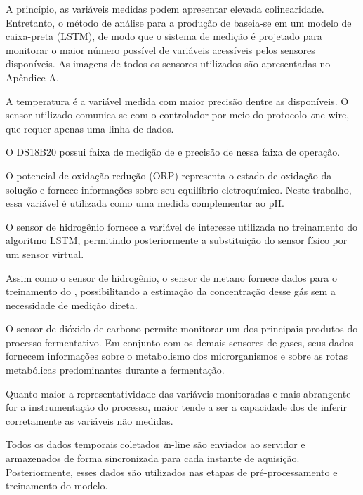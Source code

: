 \startsection[title={Sensores}]
	A princípio, as variáveis medidas podem apresentar elevada colinearidade. Entretanto, o método de análise para a produção de \getbuffer[sens] baseia-se em um modelo de caixa-preta (LSTM), de modo que o sistema de medição é projetado para monitorar o maior número possível de variáveis acessíveis pelos sensores disponíveis. As imagens de todos os sensores utilizados são apresentadas no Apêndice A.

	\startitemize
			\indentitem A temperatura é a variável medida com maior precisão dentre as disponíveis. O sensor utilizado comunica-se com o controlador por meio do protocolo {\emph one-wire}, que requer apenas uma linha de dados.

			O DS18B20 possui faixa de medição de  e precisão de \math{\pm 0.5 \celsius} nessa faixa de operação.
		\stophead

			\indentitem O potencial de oxidação-redução (ORP) representa o estado de oxidação da solução e fornece informações sobre seu equilíbrio eletroquímico. Neste trabalho, essa variável é utilizada como uma medida complementar ao pH.
		\stophead

			\indentitem O sensor de hidrogênio fornece a variável de interesse utilizada no treinamento do algoritmo LSTM, permitindo posteriormente a substituição do sensor físico por um sensor virtual.
		\stophead

			\indentitem Assim como o sensor de hidrogênio, o sensor de metano fornece dados para o treinamento do \getbuffer[sens], possibilitando a estimação da concentração desse gás sem a necessidade de medição direta.
		\stophead

			\indentitem O sensor de dióxido de carbono permite monitorar um dos principais produtos do processo fermentativo. Em conjunto com os demais sensores de gases, seus dados fornecem informações sobre o metabolismo dos microrganismos e sobre as rotas metabólicas predominantes durante a fermentação.

			Quanto maior a representatividade das variáveis monitoradas e mais abrangente for a instrumentação do processo, maior tende a ser a capacidade dos \plural{\getbuffer[sens]} de inferir corretamente as variáveis não medidas.
		\stophead
	\stopitemize

	Todos os dados temporais coletados {\emph in-line} são enviados ao servidor e armazenados de forma sincronizada para cada instante de aquisição. Posteriormente, esses dados são utilizados nas etapas de pré-processamento e treinamento do modelo.
\stopsection

